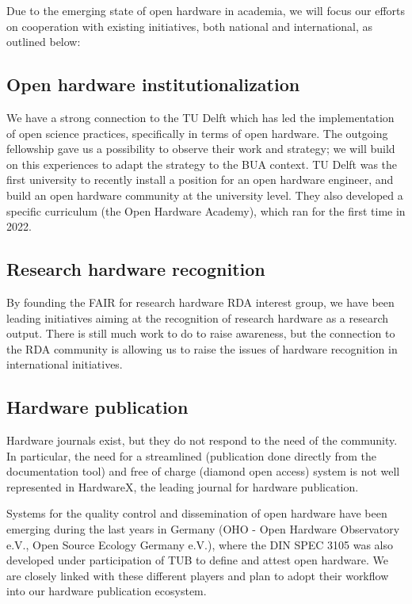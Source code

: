 \documentclass[
  12pt,
  a4paper,
]{article}
\begin{document}
Due to the emerging state of open hardware in academia, we will focus
our efforts on cooperation with existing initiatives, both national and
international, as outlined below:

\hypertarget{open-hardware-institutionalization}{%
\subsection{Open hardware
institutionalization}\label{open-hardware-institutionalization}}

We have a strong connection to the TU Delft which has led the
implementation of open science practices, specifically in terms of open
hardware. The outgoing fellowship gave us a possibility to observe their
work and strategy; we will build on this experiences to adapt the
strategy to the BUA context. TU Delft was the first university to
recently install a position for an open hardware engineer, and build an
open hardware community at the university level. They also developed a
specific curriculum (the Open Hardware Academy), which ran for the first
time in 2022.

\hypertarget{research-hardware-recognition}{%
\subsection{Research hardware
recognition}\label{research-hardware-recognition}}

By founding the FAIR for research hardware RDA interest group, we have
been leading initiatives aiming at the recognition of research hardware
as a research output. There is still much work to do to raise awareness,
but the connection to the RDA community is allowing us to raise the
issues of hardware recognition in international initiatives.

\hypertarget{hardware-publication}{%
\subsection{Hardware publication}\label{hardware-publication}}

Hardware journals exist, but they do not respond to the need of the
community. In particular, the need for a streamlined (publication done
directly from the documentation tool) and free of charge (diamond open
access) system is not well represented in HardwareX, the leading journal
for hardware publication.

Systems for the quality control and dissemination of open hardware have
been emerging during the last years in Germany (OHO - Open Hardware
Observatory e.V., Open Source Ecology Germany e.V.), where the DIN SPEC
3105 was also developed under participation of TUB to define and attest
open hardware. We are closely linked with these different players and
plan to adopt their workflow into our hardware publication ecosystem.
\end{document}
